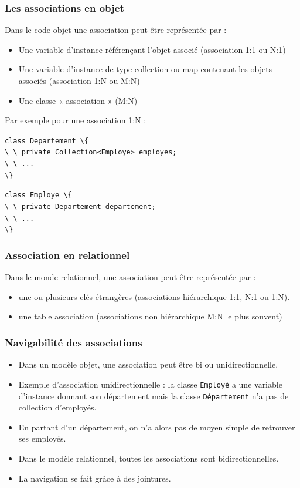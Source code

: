 \documentclass[xcolor=pdftex,x11names,table]{beamer}
\begin{document}
		\begin{frame}
    \frametitle{Les associations en objet}
    	Dans le code objet une association peut être représentée par :
		  \begin{itemize}
		  	\item Une variable d’instance référençant l’objet associé (association 1:1 ou N:1)
		  	\item Une variable d’instance de type collection ou map contenant les objets associés (association 1:N ou M:N)
		  	\item Une classe « association » (M:N)
		  \end{itemize}
		  Par exemple pour une association 1:N :
		  \begin{block}{}
    		\lstinline$class Departement \{$\\
    		\lstinline$\ \ private Collection<Employe> employes;$\\
    		\lstinline$\ \ ...$\\
    		\lstinline$\}$
    	\end{block}
    	\begin{block}{}
    		\lstinline$class Employe \{$\\
    		\lstinline$\ \ private Departement departement;$\\
    		\lstinline$\ \ ...$\\
    		\lstinline$\}$
    	\end{block}
   	\end{frame}
 
		\begin{frame}
    \frametitle{Association en relationnel}
    Dans le monde relationnel, une association peut être représentée par :
		  \begin{itemize}
		  	\item une ou plusieurs clés étrangères (associations hiérarchique 1:1, N:1 ou 1:N).
				\item une table association (associations non hiérarchique M:N le plus souvent)
		  \end{itemize}	
   	\end{frame}

		\begin{frame}
    \frametitle{Navigabilité des associations}
		  \begin{itemize}
		  	\item Dans un modèle objet, une association peut être bi ou unidirectionnelle.
		  	\item Exemple d’association unidirectionnelle : la classe \texttt{Employé} a une variable d’instance
							donnant son département mais la classe \texttt{Département} n’a pas de collection d’employés.
				\item En partant d’un département, on n’a alors pas de moyen simple de retrouver ses employés.
				\item Dans le modèle relationnel, toutes les associations sont bidirectionnelles.
				\item La navigation se fait grâce à des jointures. 
		  \end{itemize}	
   	\end{frame}
\end{document}
